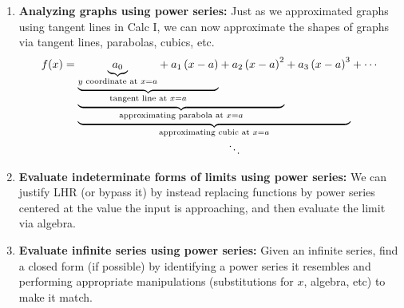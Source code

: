 \begin{enumerate}
\begin{enumerate}
\item {\bf Analyzing graphs using power series:} Just as we approximated graphs using tangent lines in Calc I, we can now approximate the shapes of graphs via tangent lines, parabolas, cubics, etc.  $$f(x)=\underset{\underset{\hspace{.5in}\ddots}{\text{approximating cubic at }x=a}}{ \underbrace{\underset{\text{approximating parabola at }x=a}{ \underbrace{\underset{\text{tangent line at }x=a}{\underbrace{\underset{y \text{ coordinate at }x=a}
{\underbrace{a_0}}+a_1\left(x-a\right)}}+a_2\left(x-a\right)^2}}+a_3\left(x-a\right)^3}}+\cdots $$

\item {\bf Evaluate indeterminate forms of limits using power series:} We can justify LHR (or bypass it) by instead replacing functions by power series centered at the value the input is approaching, and then evaluate the limit via algebra.

\item {\bf Evaluate infinite series using power series:}  Given an infinite series, find a closed form (if possible) by identifying a power series it resembles and performing appropriate manipulations (substitutions for $x$, algebra, etc) to make it match.

\end{enumerate}
\end{enumerate}